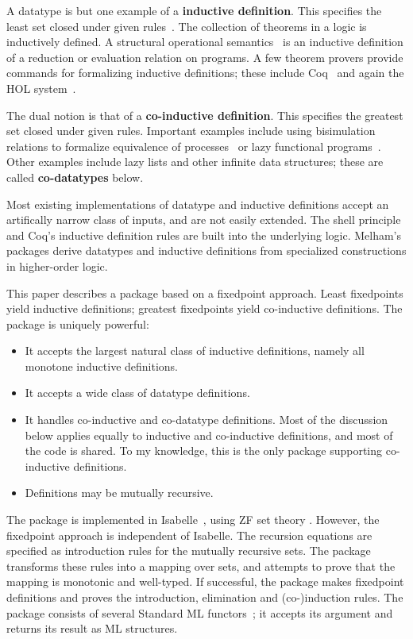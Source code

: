 A datatype is but one example of a {\bf inductive definition}.  This
specifies the least set closed under given rules~\cite{aczel77}.  The
collection of theorems in a logic is inductively defined.  A structural
operational semantics~\cite{hennessy90} is an inductive definition of a
reduction or evaluation relation on programs.  A few theorem provers
provide commands for formalizing inductive definitions; these include
Coq~\cite{paulin92} and again the HOL system~\cite{camilleri92}.

The dual notion is that of a {\bf co-inductive definition}.  This specifies
the greatest set closed under given rules.  Important examples include
using bisimulation relations to formalize equivalence of
processes~\cite{milner89} or lazy functional programs~\cite{abramsky90}.
Other examples include lazy lists and other infinite data structures; these
are called {\bf co-datatypes} below.

Most existing implementations of datatype and inductive definitions accept
an artifically narrow class of inputs, and are not easily extended.  The
shell principle and Coq's inductive definition rules are built into the
underlying logic.  Melham's packages derive datatypes and inductive
definitions from specialized constructions in higher-order logic.

This paper describes a package based on a fixedpoint approach.  Least
fixedpoints yield inductive definitions; greatest fixedpoints yield
co-inductive definitions.  The package is uniquely powerful:
\begin{itemize}
\item It accepts the largest natural class of inductive definitions, namely
  all monotone inductive definitions.
\item It accepts a wide class of datatype definitions.
\item It handles co-inductive and co-datatype definitions.  Most of
  the discussion below applies equally to inductive and co-inductive
  definitions, and most of the code is shared.  To my knowledge, this is
  the only package supporting co-inductive definitions.
\item Definitions may be mutually recursive.
\end{itemize}
The package is implemented in Isabelle~\cite{isabelle-intro}, using ZF set
theory \cite{paulson-set-I,paulson-set-II}.  However, the fixedpoint
approach is independent of Isabelle.  The recursion equations are specified
as introduction rules for the mutually recursive sets.  The package
transforms these rules into a mapping over sets, and attempts to prove that
the mapping is monotonic and well-typed.  If successful, the package
makes fixedpoint definitions and proves the introduction, elimination and
(co-)induction rules.  The package consists of several Standard ML
functors~\cite{paulson91}; it accepts its argument and returns its result
as ML structures.

